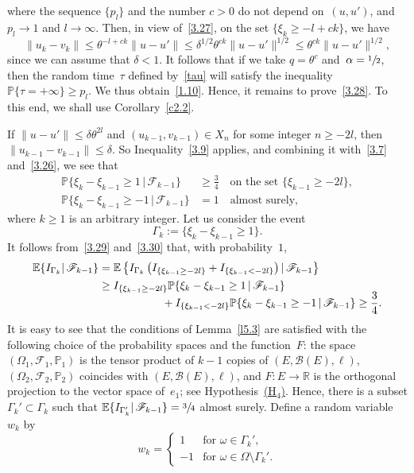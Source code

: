 \documentclass[JEP,XML,SOM,Unicode,ThmDefs]{cedram}
\let\mathcal\mathscr
\theoremstyle{plain}
\numberwithin{equation}{section}
\let\ty\infty
\newcommand{\R}{{\mathbb R}}
\newcommand{\IP}{{\mathbb P}}
\newcommand{\E}{{\mathbb E}}
\newcommand{\BB}{{\mathcal B}}
\newcommand{\FF}{{\mathcal F}}
\begin{document}
where the sequence $\{p_l\}$ and the number $c>0$ do not depend on~$(u,u')$, and $p_l\to 1$ and $l\to \ty$. Then, in view of~\eqref{3.27}, on the set $\{\xi_k\ge -l+ck\}$, we have
\[
\|u_k-v_k\|\le \theta^{-l+ck}\|u-u'\|
\le \delta^{1/2}\theta^{ck}\|u-u'\|^{1/2}\le \theta^{ck}\|u-u'\|^{1/2},
\]
since we can assume that $\delta<1$.
It follows that if we take $q=\theta^c$ and~$\alpha=\sfrac12$, then the random time~$\tau$ defined by~\eqref{tau} will satisfy the inequality $\IP\{\tau=+\infty\}\ge p_l$. We thus obtain~\eqref{1.10}. Hence, it remains to prove~\eqref{3.28}. To this end, we shall use Corollary~\ref{c2.2}.

If $\|u-u'\|\le \delta\theta^{2l}$ and $(u_{k-1}, v_{k-1})\in X_{n}$ for some integer $n\ge -2l$, then \hbox{$\|u_{k-1}-v_{k-1}\|\le\delta$}. So Inequality~\eqref{3.9} applies, and combining it with~\eqref{3.7} and~\eqref{3.26}, we see that
\begin{align}
\IP\{\xi_k-\xi_{k-1}\ge 1\,|\,\FF_{k-1}\}&\ge \frac34\quad
\text{on the set $\{\xi_{k-1}\ge -2l$\}},\label{3.29}\\
\IP\{\xi_k-\xi_{k-1}\ge -1\,|\,\FF_{k-1}\}&=1\quad
\text{almost surely},\label{3.30}
\end{align}
where $k\ge1$ is an arbitrary integer. Let us consider the event
\[
\Gamma_k:=\{\xi_k-\xi_{k-1}\ge 1 \}.
\]
It follows from~\eqref{3.29} and~\eqref{3.30} that, with probability~$1$,
\begin{align*}
\E\{I_{\Gamma_k}|\,\FF_{k-1}\}&=\E\left\{I_{\Gamma_k} \left(I_{\{\xi_{k-1}\ge -2l\}}
+I_{\{\xi_{k-1}< -2l\}}\right)|\,\FF_{k-1}\right\}\\
&\ge I_{\{\xi_{k-1}\ge -2l\}}\IP\{\xi_k-\xi_{k-1}\ge 1\,|\,\FF_{k-1}\}
\\[-5pt]
&\hspace*{2cm} +I_{\{\xi_{k-1}< -2l\}}\IP\{\xi_k-\xi_{k-1}\ge -1\,|\,\FF_{k-1}\}\ge \frac34.
\end{align*}
It is easy to see that the conditions of Lemma~\ref{l5.3} are satisfied with the following choice of the probability spaces and the function~$F$: the space $(\Omega_1,\FF_1,\IP_1)$ is the tensor product of $k-1$ copies of $(E,\BB(E),\ell)$, $(\Omega_2,\FF_2,\IP_2)$ coincides with $(E,\BB(E),\ell)$, and $F:E\to\R$ is the orthogonal projection to the vector space of~$e_1$; see Hypothesis~\hyperlink{H4}{(H$_4$)}. Hence, there is a subset $\Gamma_k'\subset\Gamma_k$ such that $\E\{I_{\Gamma_k'}|\,\FF_{k-1}\}=\sfrac34$ almost surely. Define a random variable~$w_k$ by
\[
w_k=
\begin{cases}
1&\text{for $\omega\in\Gamma_k'$},\\[3pt]
-1&\text{for $\omega\in\Omega\setminus\Gamma_k'$}.
\end{cases}
\]
\end{document}
